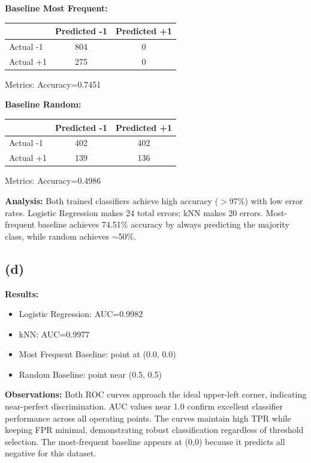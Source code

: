 \documentclass[11pt,a4paper]{article}
\begin{document}
\textbf{Baseline Most Frequent:}
\begin{table}[H]
\centering
\begin{tabular}{lcc}
\toprule
 & Predicted -1 & Predicted +1 \\
\midrule
Actual -1 & 804 & 0 \\
Actual +1 & 275 & 0 \\
\bottomrule
\end{tabular}
\end{table}
Metrics: Accuracy=0.7451

\textbf{Baseline Random:}
\begin{table}[H]
\centering
\begin{tabular}{lcc}
\toprule
 & Predicted -1 & Predicted +1 \\
\midrule
Actual -1 & 402 & 402 \\
Actual +1 & 139 & 136 \\
\bottomrule
\end{tabular}
\end{table}
Metrics: Accuracy=0.4986

\textbf{Analysis:} Both trained classifiers achieve high accuracy ($>$97\%) with low error rates. Logistic Regression makes 24 total errors; kNN makes 20 errors. Most-frequent baseline achieves 74.51\% accuracy by always predicting the majority class, while random achieves $\sim$50\%.

\subsection*{(d)}

\textbf{Results:}
\begin{itemize}
    \item Logistic Regression: AUC=0.9982
    \item kNN: AUC=0.9977
    \item Most Frequent Baseline: point at (0.0, 0.0)
    \item Random Baseline: point near (0.5, 0.5)
\end{itemize}

\textbf{Observations:} Both ROC curves approach the ideal upper-left corner, indicating near-perfect discrimination. AUC values near 1.0 confirm excellent classifier performance across all operating points. The curves maintain high TPR while keeping FPR minimal, demonstrating robust classification regardless of threshold selection. The most-frequent baseline appears at (0,0) because it predicts all negative for this dataset.
\end{document}
